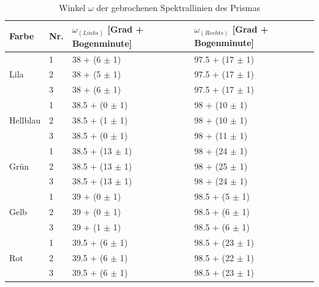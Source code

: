 \documentclass[12pt,a4paper,twoside]{article}
\begin{document}
\begin{table}[H]
    \centering
    \caption{Winkel $\omega$ der gebrochenen Spektrallinien des Prismas}
    \label{tab:Prisma v2}
    \begin{tabular}{| l | l | l | l |}
        \hline
        Farbe & Nr. & $\omega_(Links)$ [Grad + Bogenminute] & $\omega_(Rechts)$ [Grad + Bogenminute] \\
        \hline
        \hline
                &  1 & 38 + (6 $\pm$ 1) & 97.5 + (17 $\pm$ 1) \\
        Lila    &  2 & 38 + (5 $\pm$ 1) & 97.5 + (17 $\pm$ 1) \\
                &  3 & 38 + (6 $\pm$ 1) & 97.5 + (17 $\pm$ 1) \\
        \hline
                &  1 & 38.5 + (0 $\pm$ 1) & 98 + (10 $\pm$ 1) \\
        Hellblau&  2 & 38.5 + (1 $\pm$ 1) & 98 + (10 $\pm$ 1) \\
                &  3 & 38.5 + (0 $\pm$ 1) & 98 + (11 $\pm$ 1) \\
        \hline
                &  1 & 38.5 + (13 $\pm$ 1) & 98 + (24 $\pm$ 1) \\
        Grün    &  2 & 38.5 + (13 $\pm$ 1) & 98 + (25 $\pm$ 1) \\
                &  3 & 38.5 + (13 $\pm$ 1) & 98 + (24 $\pm$ 1) \\
        \hline
                &  1 & 39 + (0 $\pm$ 1) & 98.5 + (5 $\pm$ 1) \\
        Gelb    &  2 & 39 + (0 $\pm$ 1) & 98.5 + (6 $\pm$ 1) \\
                &  3 & 39 + (1 $\pm$ 1) & 98.5 + (6 $\pm$ 1) \\
        \hline
                &  1 & 39.5 + (6 $\pm$ 1) & 98.5 + (23 $\pm$ 1) \\
        Rot     &  2 & 39.5 + (6 $\pm$ 1) & 98.5 + (22 $\pm$ 1) \\
                &  3 & 39.5 + (6 $\pm$ 1) & 98.5 + (23 $\pm$ 1) \\
        \hline
    \end{tabular}
\end{table}
\end{document}
